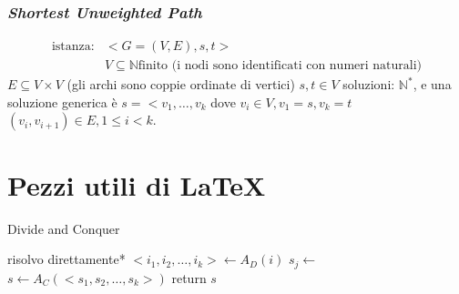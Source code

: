 \subsubsection{\textit{Shortest Unweighted Path}}

\begin{align*}
    \text{istanza:} & <G=(V,E), s, t> \\
    & V \subseteq \mathbb{N} \text{finito (i nodi sono identificati con numeri naturali)}
\end{align*}
    $E \subseteq V \times V$ (gli archi sono coppie ordinate di vertici)
    $s, t \in V$
    soluzioni: $\mathbb{N}^*$, e una soluzione generica è $s=<v_1, \dots, v_k$
    dove $v_i \in V, v_1=s, v_k=t$ 
    $\left( v_i, v_{i+1} \right) \in E, 1 \leq i < k$.










\section{Pezzi utili di \LaTeX{}}
\begin{algorithm}[H]
\caption{Divide and Conquer}\label{alg:dnc}
\begin{algorithmic}[1]
                                     
            \State *risolvo direttamente*
        \EndIf
        \State $<i_1, i_2, \dots, i_k> \gets A_D(i)$    
                            
            \State $s_j \gets $ 
        \EndFor
        \State $s \gets A_C(<s_1, s_2, \dots, s_k>)$    
        \State return $s$
    \EndProcedure
\end{algorithmic}
\end{algorithm}


